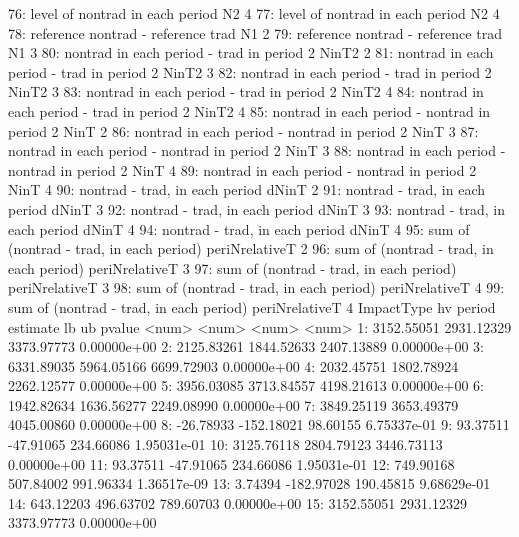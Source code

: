 \begin{Schunk}
\begin{Soutput}
76:              level of nontrad in each period             N2      4
77:              level of nontrad in each period             N2      4
78:           reference nontrad - reference trad             N1      2
79:           reference nontrad - reference trad             N1      3
80:    nontrad in each period - trad in period 2          NinT2      2
81:    nontrad in each period - trad in period 2          NinT2      3
82:    nontrad in each period - trad in period 2          NinT2      3
83:    nontrad in each period - trad in period 2          NinT2      4
84:    nontrad in each period - trad in period 2          NinT2      4
85: nontrad in each period - nontrad in period 2           NinT      2
86: nontrad in each period - nontrad in period 2           NinT      3
87: nontrad in each period - nontrad in period 2           NinT      3
88: nontrad in each period - nontrad in period 2           NinT      4
89: nontrad in each period - nontrad in period 2           NinT      4
90:               nontrad - trad, in each period          dNinT      2
91:               nontrad - trad, in each period          dNinT      3
92:               nontrad - trad, in each period          dNinT      3
93:               nontrad - trad, in each period          dNinT      4
94:               nontrad - trad, in each period          dNinT      4
95:      sum of (nontrad - trad, in each period) periNrelativeT      2
96:      sum of (nontrad - trad, in each period) periNrelativeT      3
97:      sum of (nontrad - trad, in each period) periNrelativeT      3
98:      sum of (nontrad - trad, in each period) periNrelativeT      4
99:      sum of (nontrad - trad, in each period) periNrelativeT      4
                                      ImpactType             hv period
      estimate         lb         ub      pvalue
         <num>      <num>      <num>       <num>
 1: 3152.55051 2931.12329 3373.97773 0.00000e+00
 2: 2125.83261 1844.52633 2407.13889 0.00000e+00
 3: 6331.89035 5964.05166 6699.72903 0.00000e+00
 4: 2032.45751 1802.78924 2262.12577 0.00000e+00
 5: 3956.03085 3713.84557 4198.21613 0.00000e+00
 6: 1942.82634 1636.56277 2249.08990 0.00000e+00
 7: 3849.25119 3653.49379 4045.00860 0.00000e+00
 8:  -26.78933 -152.18021   98.60155 6.75337e-01
 9:   93.37511  -47.91065  234.66086 1.95031e-01
10: 3125.76118 2804.79123 3446.73113 0.00000e+00
11:   93.37511  -47.91065  234.66086 1.95031e-01
12:  749.90168  507.84002  991.96334 1.36517e-09
13:    3.74394 -182.97028  190.45815 9.68629e-01
14:  643.12203  496.63702  789.60703 0.00000e+00
15: 3152.55051 2931.12329 3373.97773 0.00000e+00

\end{Soutput}
\end{Schunk}
